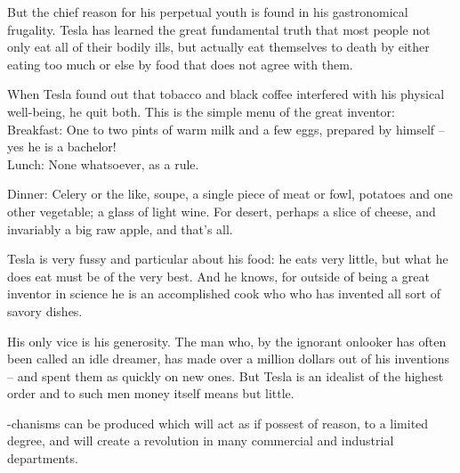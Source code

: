 \documentclass[a4paper,12pt,english,twoside,openright]{memoir}
\begin{document}
{{\begin{minipage}{.65\linewidth}
\begin{multicols}{2}
								But the chief reason for his perpetual youth is found in his gastronomical frugality. Tesla has learned the great fundamental truth that most people not only eat all of their bodily ills, but actually eat themselves to death by either eating too much or else by food that does not agree with them.
								
								When Tesla found out that tobacco and black coffee interfered with his physical well-being, he quit both. This is the simple menu of the great inventor:\\
								Breakfast: One to two pints of warm milk and a few eggs, prepared by himself -- yes he is a bachelor!\\
								Lunch: None whatsoever, as a rule.
								
								\columnbreak
								Dinner: Celery or the like, soupe, a single piece of meat or fowl, potatoes and one other vegetable; a glass of light wine. For desert, perhaps a slice of cheese, and invariably a big raw apple, and that's all.
								
								Tesla is very fussy and particular about his food: he eats very little, but what he does eat must be of the very best. And he knows, for outside of being a great inventor in science he is an accomplished cook who who has invented all sort of savory dishes.
								
								His only vice is his generosity. The man who, by the ignorant onlooker has often been called an idle dreamer, has made over a million dollars out of his inventions -- and spent them as quickly on new ones. But Tesla is an idealist of the highest order and to such men money itself means but little.
							\end{multicols}
							
						\end{minipage}}
					}
					\newpage
	
	
	\noindent -chanisms can be produced which will act as if possest of reason, to 
	a limited degree, and will create a revolution in many commercial and industrial departments.  
	
\end{document}
